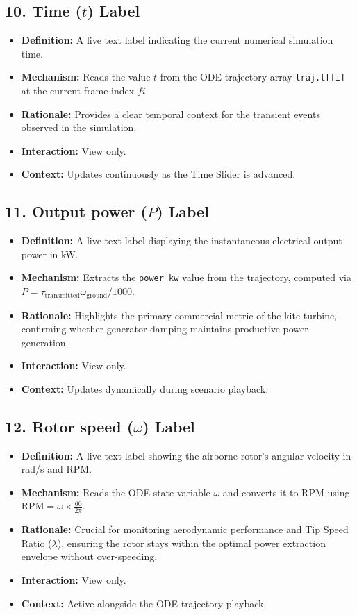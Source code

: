 \documentclass[11pt,a4paper]{article}
\begin{document}
\subsection{10. Time ($t$) Label}
\begin{itemize}
    \item \textbf{Definition:} A live text label indicating the current numerical simulation time.
    \item \textbf{Mechanism:} Reads the value $t$ from the ODE trajectory array \texttt{traj.t[fi]} at the current frame index $fi$.
    \item \textbf{Rationale:} Provides a clear temporal context for the transient events observed in the simulation.
    \item \textbf{Interaction:} View only.
    \item \textbf{Context:} Updates continuously as the Time Slider is advanced.
\end{itemize}

\subsection{11. Output power ($P$) Label}
\begin{itemize}
    \item \textbf{Definition:} A live text label displaying the instantaneous electrical output power in kW.
    \item \textbf{Mechanism:} Extracts the \texttt{power\_kw} value from the trajectory, computed via $P = \tau_{\text{transmitted}} \omega_{\text{ground}} / 1000$.
    \item \textbf{Rationale:} Highlights the primary commercial metric of the kite turbine, confirming whether generator damping maintains productive power generation.
    \item \textbf{Interaction:} View only.
    \item \textbf{Context:} Updates dynamically during scenario playback.
\end{itemize}

\subsection{12. Rotor speed ($\omega$) Label}
\begin{itemize}
    \item \textbf{Definition:} A live text label showing the airborne rotor's angular velocity in rad/s and RPM.
    \item \textbf{Mechanism:} Reads the ODE state variable $\omega$ and converts it to RPM using $\text{RPM} = \omega \times \frac{60}{2\pi}$.
    \item \textbf{Rationale:} Crucial for monitoring aerodynamic performance and Tip Speed Ratio ($\lambda$), ensuring the rotor stays within the optimal power extraction envelope without over-speeding.
    \item \textbf{Interaction:} View only.
    \item \textbf{Context:} Active alongside the ODE trajectory playback.
\end{itemize}
\end{document}
